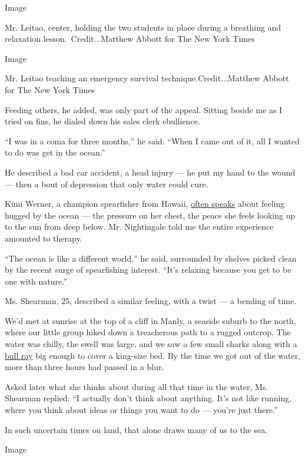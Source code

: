Image

Mr. Leitao, center, holding the two students in place during a breathing
and relaxation lesson.~Credit...Matthew Abbott for The New York Times

Image

Mr. Leitao teaching an emergency survival technique.Credit...Matthew
Abbott for The New York Times

Feeding others, he added, was only part of the appeal. Sitting beside me
as I tried on fins, he dialed down his sales clerk ebullience.

``I was in a coma for three months,'' he said. ``When I came out of it,
all I wanted to do was get in the ocean.''

He described a bad car accident, a head injury --- he put my hand to the
wound --- then a bout of depression that only water could cure.

Kimi Werner, a champion spearfisher from Hawaii,
\href{https://waterpeoplepodcast.com/2019/07/09/kimi-werner-flipping-your-instincts/}{often
speaks} about feeling hugged by the ocean --- the pressure on her chest,
the peace she feels looking up to the sun from deep below. Mr.
Nightingale told me the entire experience amounted to therapy.

``The ocean is like a different world,'' he said, surrounded by shelves
picked clean by the recent surge of spearfishing interest. ``It's
relaxing because you get to be one with nature.''

Ms. Shearman, 25, described a similar feeling, with a twist --- a
bending of time.

We'd met at sunrise at the top of a cliff in Manly, a seaside suburb to
the north, where our little group hiked down a treacherous path to a
rugged outcrop. The water was chilly, the swell was large, and we saw a
few small sharks along with a
\href{http://www.dpi.nsw.gov.au/__data/assets/pdf_file/0004/264775/Identifying-sharks-and-rays.pdf}{bull
ray} big enough to cover a king-size bed. By the time we got out of the
water, more than three hours had passed in a blur.

Asked later what she thinks about during all that time in the water, Ms.
Shearman replied: ``I actually don't think about anything. It's not like
running, where you think about ideas or things you want to do --- you're
just there.''

In such uncertain times on land, that alone draws many of us to the sea.

Image


